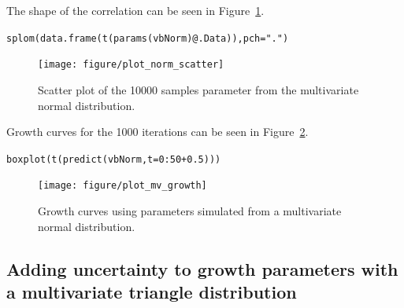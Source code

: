 \documentclass[a4paper,english,10pt]{article}\usepackage[]{graphicx}\usepackage[]{color}
\makeatletter
\newcommand{\hlnum}[1]{\textcolor[rgb]{0.2,0.2,0.2}{#1}}%
\newcommand{\hlstr}[1]{\textcolor[rgb]{0.2,0.2,0.2}{#1}}%
\newcommand{\hlopt}[1]{\textcolor[rgb]{0.2,0.2,0.2}{#1}}%
\newcommand{\hlstd}[1]{\textcolor[rgb]{0,0,0}{#1}}%
\newcommand{\hlkwc}[1]{\textcolor[rgb]{0.361,0.506,0.596}{#1}}%
\newcommand{\hlkwd}[1]{\textcolor[rgb]{0.361,0.506,0.596}{#1}}%
\newenvironment{kframe}{%
 \def\at@end@of@kframe{}%
 \ifinner\ifhmode%
  \def\at@end@of@kframe{\end{minipage}}%
  \begin{minipage}{\columnwidth}%
 \fi\fi%
 \def\FrameCommand##1{\hskip\@totalleftmargin \hskip-\fboxsep
 \colorbox{shadecolor}{##1}\hskip-\fboxsep
     \hskip-\linewidth \hskip-\@totalleftmargin \hskip\columnwidth}%
 \MakeFramed {\advance\hsize-\width
   \@totalleftmargin\z@ \linewidth\hsize
   \@setminipage}}%
 {\par\unskip\endMakeFramed%
 \at@end@of@kframe}
\newenvironment{knitrout}{}{} %
\makeatother
\begin{document}
The shape of the correlation can be seen in Figure~\ref{fig:plot_norm_scatter}.
\begin{knitrout}
\color{fgcolor}\begin{kframe}
\begin{alltt}
\hlkwd{splom}\hlstd{(}\hlkwd{data.frame}\hlstd{(}\hlkwd{t}\hlstd{(}\hlkwd{params}\hlstd{(vbNorm)}\hlopt{@}\hlkwc{.Data}\hlstd{)),} \hlkwc{pch}\hlstd{=}\hlstr{"."}\hlstd{)}
\end{alltt}
\end{kframe}\begin{figure}[H]


{\centering \texttt{[image: figure/plot\_norm\_scatter]} 

}

\caption[Scatter plot of the 10000 samples parameter from the multivariate normal distribution]{Scatter plot of the 10000 samples parameter from the multivariate normal distribution.\label{fig:plot_norm_scatter}}
\end{figure}


\end{knitrout}

Growth curves for the 1000 iterations can be seen in Figure~\ref{fig:plot_mv_growth}.

\begin{knitrout}
\color{fgcolor}\begin{kframe}
\begin{alltt}
\hlkwd{boxplot}\hlstd{(}\hlkwd{t}\hlstd{(}\hlkwd{predict}\hlstd{(vbNorm,} \hlkwc{t}\hlstd{=}\hlnum{0}\hlopt{:}\hlnum{50}\hlopt{+}\hlnum{0.5}\hlstd{)))}
\end{alltt}
\end{kframe}\begin{figure}[H]


{\centering \texttt{[image: figure/plot\_mv\_growth]} 

}

\caption[Growth curves using parameters simulated from a multivariate normal distribution]{Growth curves using parameters simulated from a multivariate normal distribution.\label{fig:plot_mv_growth}}
\end{figure}


\end{knitrout}

\subsection{Adding uncertainty to growth parameters with a multivariate triangle distribution}
\label{sec:growth_triangle_cop}
\end{document}
